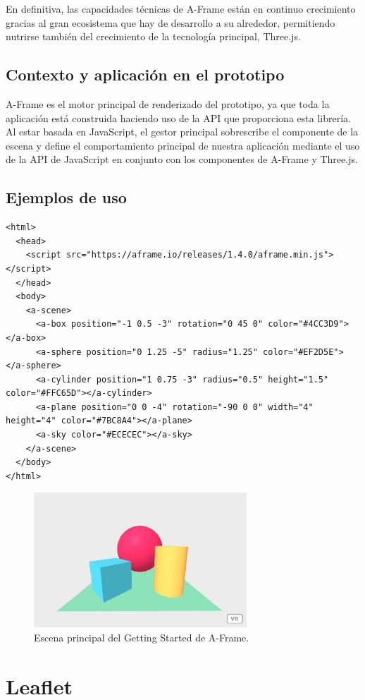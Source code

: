 \documentclass[a4paper, 11pt]{book}
\begin{document}
En definitiva, las capacidades técnicas de A-Frame están en continuo crecimiento gracias al gran ecosistema que hay de desarrollo a su alrededor, permitiendo nutrirse también del crecimiento de la tecnología principal, Three.js.
\subsection{Contexto y aplicación en el prototipo}
A-Frame es el motor principal de renderizado del prototipo, ya que toda la aplicación está construida haciendo uso de la API que proporciona esta librería. Al estar basada en JavaScript, el gestor principal sobrescribe el componente de la escena y define el comportamiento principal de nuestra aplicación mediante el uso de la API de JavaScript en conjunto con los componentes de A-Frame y Three.js.
\subsection{Ejemplos de uso}
\begin{verbatim}
<html>
  <head>
    <script src="https://aframe.io/releases/1.4.0/aframe.min.js"></script>
  </head>
  <body>
    <a-scene>
      <a-box position="-1 0.5 -3" rotation="0 45 0" color="#4CC3D9"></a-box>
      <a-sphere position="0 1.25 -5" radius="1.25" color="#EF2D5E"></a-sphere>
      <a-cylinder position="1 0.75 -3" radius="0.5" height="1.5" color="#FFC65D"></a-cylinder>
      <a-plane position="0 0 -4" rotation="-90 0 0" width="4" height="4" color="#7BC8A4"></a-plane>
      <a-sky color="#ECECEC"></a-sky>
    </a-scene>
  </body>
</html>
\end{verbatim}
\begin{figure}[H]
  \centering
  \includegraphics[width=8cm, keepaspectratio]{img/gettingstarted_Aframe.jpg}
  \caption{Escena principal del Getting Started de A-Frame.}
  \label{fig:AFrameGettingStarted}
\end{figure}
\section{Leaflet}
\label{sec:leaflet}
\end{document}
